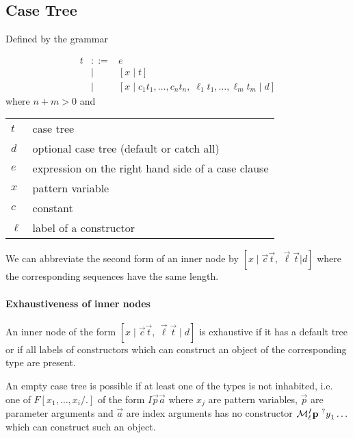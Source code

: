 \subsection{Case Tree}


Defined by the grammar

$$
    \begin{array}{lllll}
        t
        &::=& e
        \\
        &\mid& [x \mid t]
        \\
        &\mid& [
            x
            \mid
            c_1 t_1, \ldots,  c_n t_n,\;
            \ell_1 t_1, \ldots, \ell_m t_m
            \mid
            d
        ]
    \end{array}
$$
%
where $n + m > 0$ and
%
\begin{center}
    \begin{tabular}{l p{8cm}}
        $t$ & case tree
        \\
        $d$ & optional case tree (default or catch all)
        \\
        $e$ & expression on the right hand side of a case clause
        \\
        $x$ & pattern variable
        \\
        $c$ & constant
        \\
        $\ell$ & label of a constructor
    \end{tabular}
\end{center}

We can abbreviate the second form of an inner node by $[x \mid \vec c\vec t,\,
\vec\ell \vec t | d]$ where the corresponding sequences have the same length.



\paragraph{Exhaustiveness of inner nodes}
%

An inner node of the form $[x \mid \vec c \vec t,\, \vec\ell \vec t \mid d]$ is
exhaustive if it has a default tree or if all labels of constructors which can
construct an object of the corresponding type are present.

An empty case tree is possible if at least one of the types is not inhabited,
i.e. one of $F[x_1, \ldots, x_i/.]$ of the form $I \vec p \vec a$  where $x_j$
are pattern variables, $\vec p$ are parameter arguments and $\vec a$ are index
arguments has no constructor ${\cal M}^I_\ell {\mathbf p} {\ ^?y}_1 \ldots$
which can construct such an object.


